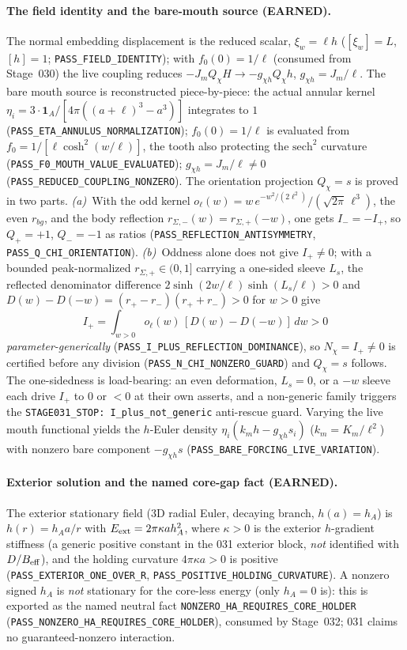 \paragraph{The field identity and the bare-mouth source (EARNED).}
The normal embedding displacement is the reduced scalar, \(\xi_w=\ell h\)
(\([\xi_w]=L\), \([h]=1\); \texttt{PASS\_FIELD\_IDENTITY}); with \(f_0(0)=1/\ell\)
(consumed from Stage~030) the live coupling reduces \(-J_m Q_\chi H\to-g_{\chi h}
Q_\chi h\), \(g_{\chi h}=J_m/\ell\). The bare mouth source is reconstructed
piece-by-piece: the actual annular kernel
\(\eta_i=3\cdot\mathbf{1}_A/[4\pi((a+\ell)^3-a^3)]\) integrates to \(1\)
(\texttt{PASS\_ETA\_ANNULUS\_NORMALIZATION}); \(f_0(0)=1/\ell\) is evaluated from
\(f_0=1/[\ell\cosh^2(w/\ell)]\), the tooth also protecting the \(\mathrm{sech}^2\)
curvature (\texttt{PASS\_F0\_MOUTH\_VALUE\_EVALUATED}); \(g_{\chi h}=J_m/\ell\ne0\)
(\texttt{PASS\_REDUCED\_COUPLING\_NONZERO}). The orientation projection
\(Q_\chi=s\) is proved in two parts. \emph{(a)}~With the odd kernel
\(o_\ell(w)=w\,e^{-w^2/(2\ell^2)}/(\sqrt{2\pi}\,\ell^3)\), the even \(r_{bg}\), and
the body reflection \(r_{\Sigma,-}(w)=r_{\Sigma,+}(-w)\), one gets \(I_-=-I_+\),
so \(Q_+=+1\), \(Q_-=-1\) as ratios (\texttt{PASS\_REFLECTION\_ANTISYMMETRY},
\texttt{PASS\_Q\_CHI\_ORIENTATION}). \emph{(b)}~Oddness alone does not give
\(I_+\ne0\); with a bounded peak-normalized \(r_{\Sigma,+}\in(0,1]\) carrying a
one-sided sleeve \(L_s\), the reflected denominator difference
\(2\sinh(2w/\ell)\sinh(L_s/\ell)>0\) and \(D(w)-D(-w)=(r_+-r_-)(r_++r_-)>0\) for
\(w>0\) give
\[
  I_+=\int_{w>0}o_\ell(w)\,[D(w)-D(-w)]\,dw>0
\]
\emph{parameter-generically} (\texttt{PASS\_I\_PLUS\_REFLECTION\_DOMINANCE}), so
\(N_\chi=I_+\ne0\) is certified before any division
(\texttt{PASS\_N\_CHI\_NONZERO\_GUARD}) and \(Q_\chi=s\) follows. The
one-sidedness is load-bearing: an even deformation, \(L_s=0\), or a \(-w\) sleeve
each drive \(I_+\) to \(0\) or \(<0\) at their own asserts, and a non-generic
family triggers the \texttt{STAGE031\_STOP: I\_plus\_not\_generic} anti-rescue
guard. Varying the live mouth functional yields the \(h\)-Euler density
\(\eta_i(k_m h-g_{\chi h}s_i)\) (\(k_m=K_m/\ell^2\)) with nonzero bare component
\(-g_{\chi h}s\) (\texttt{PASS\_BARE\_FORCING\_LIVE\_VARIATION}).

\paragraph{Exterior solution and the named core-gap fact (EARNED).}
The exterior stationary field (3D radial Euler, decaying branch, \(h(a)=h_A\)) is
\(h(r)=h_A a/r\) with \(E_{\rm ext}=2\pi\kappa a h_A^2\), where \(\kappa>0\) is the
exterior \(h\)-gradient stiffness (a generic positive constant in the 031 exterior
block, \emph{not} identified with \(D/B_{\rm eff}\)), and the holding curvature
\(4\pi\kappa a>0\) is positive (\texttt{PASS\_EXTERIOR\_ONE\_OVER\_R},
\texttt{PASS\_POSITIVE\_HOLDING\_CURVATURE}). A nonzero signed \(h_A\) is \emph{not}
stationary for the core-less energy (only \(h_A=0\) is): this is exported as the
named neutral fact \texttt{NONZERO\_HA\_REQUIRES\_CORE\_HOLDER}
(\texttt{PASS\_NONZERO\_HA\_REQUIRES\_CORE\_HOLDER}), consumed by Stage~032; 031
claims no guaranteed-nonzero interaction.

